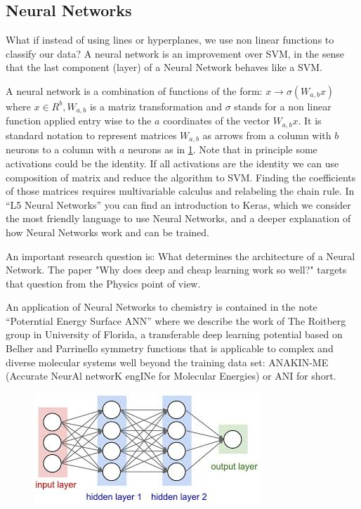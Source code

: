 \documentclass[11pt,letterpaper]{report}
\begin{document}
	\subsection{Neural Networks}  
	
	What if instead of using lines or hyperplanes, we use non linear functions to classify our data? A neural network is an improvement over SVM, in the sense that the last component (layer) of a Neural Network behaves like a SVM.
	
	 A neural network is a combination of  functions of the form:
	$x\rightarrow \sigma(W_{a,b}x)$ where $x\in R^b,  W_{a,b}$ is a matriz transformation and $\sigma$ stands for a non linear function applied entry wise to the $a$ coordinates of the vector  $W_{a,b}x.$
	It is standard notation to represent matrices  $W_{a,b}$ as arrows from a column with $b$ neurons to a column with $a$ neurons as in \ref{fig:nn}. Note that in principle some activations could be the identity. If all activations are the identity we can use composition of matrix and reduce the algorithm to SVM. Finding the coefficients of those matrices requires multivariable calculus and relabeling the chain rule. In ``L5 Neural Networks'' you can find an introduction to Keras, which we consider the most friendly language to use Neural Networks, and a deeper explanation of how Neural Networks work and can be trained.	
	
	An important research question is: What determines the architecture of a Neural Network.  The paper "Why does deep and cheap learning work so well?" targets that question from the Physics point of view.
	
	
	An application of Neural Networks to chemistry is contained in the note ``Poterntial Energy Surface ANN'' where we describe the work of The Roitberg group in University of Florida, a transferable deep learning potential based on Belher and Parrinello symmetry functions that is applicable to complex and diverse molecular systems well beyond the training data set: ANAKIN-ME (Accurate NeurAl networK engINe for Molecular Energies) or ANI for short.
	
    	\begin{figure}[h!]
    	\centering
    	\includegraphics[width=0.45\linewidth]{figures/nn.jpg}
    	\caption{}
    	\label{fig:nn}
    \end{figure} 	
\end{document}
